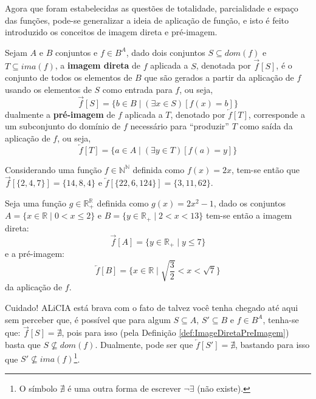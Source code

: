 Agora que foram estabelecidas as questões de totalidade, parcialidade e espaço das funções, pode-se generalizar a ideia de aplicação de função, e isto é feito introduzido os conceitos de imagem direta e pré-imagem.

\begin{definicao}\label{def:ImageDiretaPreImagem}
  Sejam $A$ e $B$ conjuntos e $f \in B^A$, dado dois conjuntos $S \subseteq dom(f)$ e $T \subseteq ima(f)$, a \textbf{imagem direta} de $f$ aplicada a $S$, denotada por $\overrightarrow{f}[S]$, é o conjunto de todos os elementos de $B$ que são gerados a partir da aplicação de $f$ usando os elementos de $S$ como entrada para $f$, ou seja,
	$$\overrightarrow{f}[S] = \{b \in B \mid (\exists x \in S)[f(x) = b]\}$$
	dualmente a \textbf{pré-imagem} de $f$ aplicada a $T$, denotado por $\overleftarrow{f}[T]$, corresponde a um subconjunto do domínio de $f$ necessário para ``produzir'' $T$ como saída da aplicação de $f$, ou seja, 
	$$\overleftarrow{f}[T] = \{a \in A \mid (\exists y \in T)[f(a) = y]\}$$
\end{definicao}

\begin{exemplo}\label{exe:ImagemDiretaPreImagem1}
	Considerando uma função $f \in \mathbb{N}^\mathbb{N}$ definida como $f(x)= 2x$, tem-se então que $\overrightarrow{f}[\{2, 4, 7\}] = \{14, 8, 4\}$ e $\overleftarrow{f}[\{22, 6, 124\}] = \{3, 11, 62\}$.
\end{exemplo}

\begin{exemplo}\label{exe:ImagemDiretaPreImagem2}
  Seja uma função $g \in \mathbb{R}^\mathbb{R}_+$ definida como $g(x)= 2x^2 - 1$, dado os conjuntos $A = \{ x\in \mathbb{R} \mid 0 < x \leq 2\}$ e $B = \{y \in \mathbb{R}_+ \mid 2 < x < 13\}$ tem-se então a imagem direta: 
  $$\overrightarrow{f}[A] = \{y \in \mathbb{R}_+ \mid y \leq 7 \}$$ 
  e a pré-imagem: 
  $$\overleftarrow{f}[B] = \displaystyle\Big\{x \in \mathbb{R} \mid \sqrt{\frac{3}{2}} < x < \sqrt{7}\Big\}$$
  da aplicação de $f$.
\end{exemplo}

\begin{cuidado}
  Cuidado! ALiCIA está brava com o fato de talvez você tenha chegado até aqui sem perceber que, é possível que para algum $S \subseteq A$, $S' \subseteq B$ e $f \in B^A$, tenha-se que: $\overrightarrow{f}[S] = \nexists$, pois para isso (pela Definição \ref{def:ImageDiretaPreImagem}) basta que $S \not\subseteq dom(f)$. Dualmente, pode ser que $\overleftarrow{f}[S'] = \nexists$, bastando para isso que $S' \not\subseteq ima(f)$\footnote{O símbolo $\nexists$ é uma outra forma de escrever $\neg\exists$ (não existe).}.
\end{cuidado}

